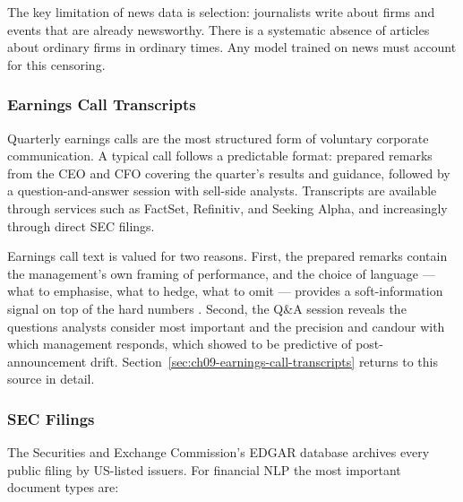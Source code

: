 The key limitation of news data is selection: journalists write about firms and events that are already newsworthy. There is a systematic absence of articles about ordinary firms in ordinary times. Any model trained on news must account for this censoring.

\subsubsection*{Earnings Call Transcripts}

Quarterly earnings calls are the most structured form of voluntary corporate communication. A typical call follows a predictable format: prepared remarks from the CEO and CFO covering the quarter's results and guidance, followed by a question-and-answer session with sell-side analysts. Transcripts are available through services such as FactSet, Refinitiv, and Seeking Alpha, and increasingly through direct SEC filings.

Earnings call text is valued for two reasons. First, the prepared remarks contain the management's own framing of performance, and the choice of language --- what to emphasise, what to hedge, what to omit --- provides a soft-information signal on top of the hard numbers \cite{larcker2012detecting}. Second, the Q\&A session reveals the questions analysts consider most important and the precision and candour with which management responds, which \citet{feldman2010management} showed to be predictive of post-announcement drift. Section~\ref{sec:ch09-earnings-call-transcripts} returns to this source in detail.

\subsubsection*{SEC Filings}

The Securities and Exchange Commission's EDGAR database archives every public filing by US-listed issuers. For financial NLP the most important document types are:

